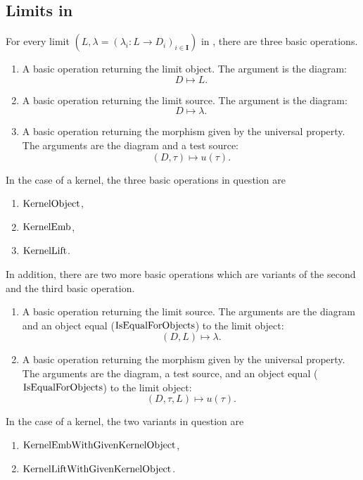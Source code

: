 \subsection{Limits in \CapPkg}

For every limit $\left(L, \lambda = ( \lambda_i: L \rightarrow D_i)_{i \in \mathbf{I}} \right)$ in \CapPkg, 
there are three basic operations.

\begin{enumerate}
 \item A basic operation returning the limit object. The argument is the diagram:
 \[
  D \mapsto L.
 \]
 \item A basic operation returning the limit source. The argument is the diagram:
 \[
  D \mapsto \lambda.
 \]
 \item A basic operation returning the morphism given by the universal property. 
       The arguments are the diagram and a test source:
 \[
  ( D, \tau ) \mapsto u(\tau).
 \]
\end{enumerate}

\begin{example}
 In the case of a kernel, the three basic operations in question are
 \begin{enumerate}
  \item $\mathrm{KernelObject}$,
  \item $\mathrm{KernelEmb}$,
  \item $\mathrm{KernelLift}$.
 \end{enumerate} 
\end{example}

In addition, there are two more basic operations which are variants of the second
and the third basic operation.

\begin{enumerate}
 \item A basic operation returning the limit source. The arguments are the diagram
       and an object equal ($\mathrm{IsEqualForObjects}$) to the limit object:
       \[
        ( D, L ) \mapsto \lambda.
       \]
  \item A basic operation returning the morphism given by the universal property.
        The arguments are the diagram, a test source, and an object equal ($\mathrm{IsEqualForObjects}$)
        to the limit object:
        \[
         ( D, \tau, L ) \mapsto u( \tau ).
        \]
\end{enumerate}

\begin{example}
 In the case of a kernel, the two variants in question are
 \begin{enumerate}
  \item $\mathrm{KernelEmbWithGivenKernelObject}$,
  \item $\mathrm{KernelLiftWithGivenKernelObject}$.
 \end{enumerate} 
\end{example}

